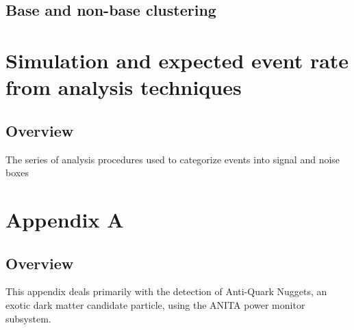 \section{Base and non-base clustering}


	
	

\chapter{Simulation and expected event rate from analysis techniques}
\section{Overview}
	The series of analysis procedures used to categorize events into signal and noise boxes
	
			
			
			
			
			
			
\chapter{Appendix A}
\section{Overview}
	This appendix deals primarily with the detection of Anti-Quark Nuggets, an exotic dark matter candidate particle, using the ANITA power monitor subsystem.
	
	
	
	
	
	
	
